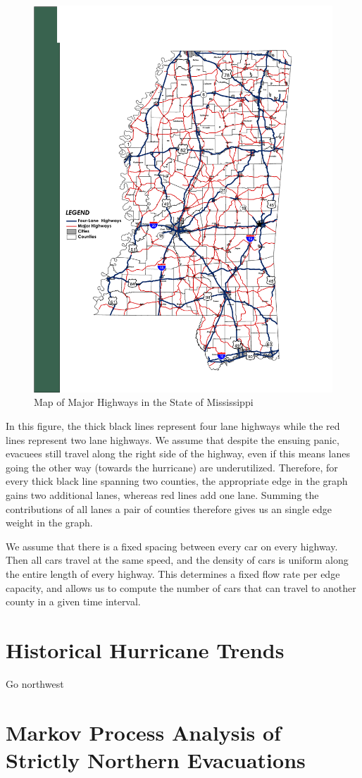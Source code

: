 \documentclass[titlepage]{article}
\begin{document}
  \begin{figure}[H]
  \centering
  \includegraphics[width=.5\textwidth]{ms_highways.pdf}
  \caption{Map of Major Highways in the State of Mississippi \cite{ms_highways}}
  \label{fig:highway_map}
  \end{figure}
  \par
    In this figure, the thick black lines represent four lane highways while the red lines represent two lane highways. We assume that despite the ensuing panic, evacuees still travel along the right side of the highway, even if this means lanes going the other way (towards the hurricane) are underutilized. Therefore, for every thick black line spanning two counties, the appropriate edge in the graph gains two additional lanes, whereas red lines add one lane. Summing the contributions of all lanes a pair of counties therefore gives us an single edge weight in the graph.
  \newline
  \par
    We assume that there is a fixed spacing between every car on every highway. Then all cars travel at the same speed, and the density of cars is uniform along the entire length of every highway. This determines a fixed flow rate per edge capacity, and allows us to compute the number of cars that can travel to another county in a given time interval.

\section{Historical Hurricane Trends}
\label{sec:hurricanes}
  Go northwest


\section{Markov Process Analysis of Strictly Northern Evacuations}
\label{sec:markov}
\end{document}
